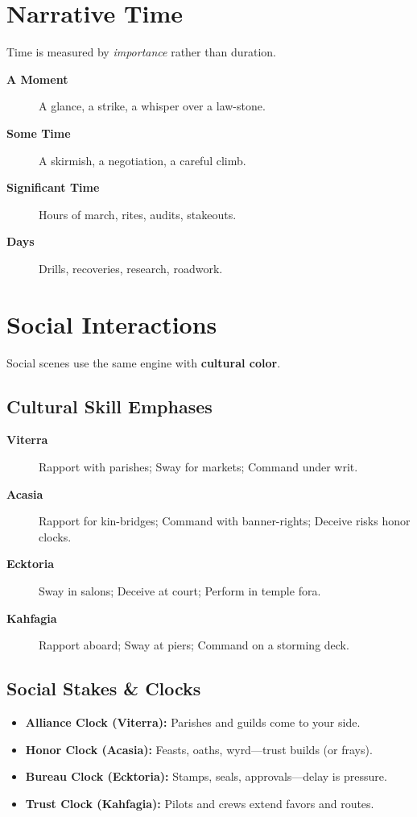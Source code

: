 \section{Narrative Time}
Time is measured by \emph{importance} rather than duration.
\begin{description}
\item[\textbf{A Moment}]  A glance, a strike, a whisper over a law-stone.
\item[\textbf{Some Time}]  A skirmish, a negotiation, a careful climb.
\item[\textbf{Significant Time}]  Hours of march, rites, audits, stakeouts.
\item[\textbf{Days}]  Drills, recoveries, research, roadwork.
\end{description}

\section{Social Interactions}
Social scenes use the same engine with \textbf{cultural color}.

\subsection*{Cultural Skill Emphases}
\begin{description}
\item[\textbf{Viterra}]  Rapport with parishes; Sway for markets; Command under writ.
\item[\textbf{Acasia}]  Rapport for kin-bridges; Command with banner-rights; Deceive risks honor clocks.
\item[\textbf{Ecktoria}]  Sway in salons; Deceive at court; Perform in temple fora.
\item[\textbf{Kahfagia}]  Rapport aboard; Sway at piers; Command on a storming deck.
\end{description}

\subsection*{Social Stakes \& Clocks}
\begin{itemize}
\item \textbf{Alliance Clock (Viterra):} Parishes and guilds come to your side.
\item \textbf{Honor Clock (Acasia):} Feasts, oaths, wyrd—trust builds (or frays).
\item \textbf{Bureau Clock (Ecktoria):} Stamps, seals, approvals—delay is pressure.
\item \textbf{Trust Clock (Kahfagia):} Pilots and crews extend favors and routes.
\end{itemize}

